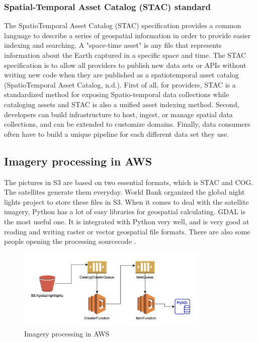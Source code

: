 \documentclass[conference]{IEEEtran}
\begin{document}
\subsubsection{Spatial-Temporal Asset Catalog (STAC) standard}

The SpatioTemporal Asset Catalog (STAC) specification provides a common language to describe a series of geospatial 
information in order to provide easier indexing and searching. A "space-time asset" is any file that represents information 
about the Earth captured in a specific space and time. The STAC specification is to allow all providers to publish new data 
sets or APIs without writing new code when they are published as a spatiotemporal asset catalog (SpatioTemporal Asset Catalog, n.d.). 
First of all, for providers, STAC is a standardized method for exposing Spatio-temporal data collections while cataloging 
assets and STAC is also a unified asset indexing method. Second, developers can build infrastructure to host, ingest, or 
manage spatial data collections, and can be extended to customize domains. Finally, data consumers often have to build a 
unique pipeline for each different data set they use.


\subsection{Imagery processing in AWS}

The pictures in S3 are based on two essential formats, which is STAC and COG. The satellites generate them everyday. 
World Bank organized the global night lights project to store these files in S3. When it comes to deal with the satellite 
imagery, Python has a lot of easy libraries for geospatial calculating. GDAL is the most useful one. 
It is integrated with Python very well, and is very good at reading and writing raster or vector geospatial file formats.
There are also some people opening the processing sourcecode \cite{Howtopro5:online}.


\begin{figure}[htbp]
    \centerline{\includegraphics[width=260pt]{images/dataprocess.png}}
    \caption{Imagery processing in AWS}
    \label{fig4}
\end{figure}
\end{document}
